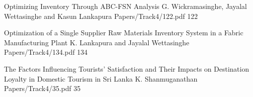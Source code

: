 





        \addpaper
    	{Optimizing Inventory Through ABC-FSN Analysis}
   		 {G. Wickramasinghe, Jayalal Wettasinghe and Kasun Lankapura} 
   		 {Papers/Track4/122.pdf}
        {122}


        \addpaper
    	{Optimization of a Single Supplier Raw Materials Inventory System in a Fabric Manufacturing Plant}
   		 {K. Lankapura and Jayalal Wettasinghe} 
   		 {Papers/Track4/134.pdf}
        {134}






        \addpaper
    	{The Factors Influencing Tourists’ Satisfaction and Their Impacts on Destination Loyalty in Domestic Tourism in Sri Lanka}
   		 {K. Shanmuganathan} 
   		 {Papers/Track4/35.pdf}
        {35}

